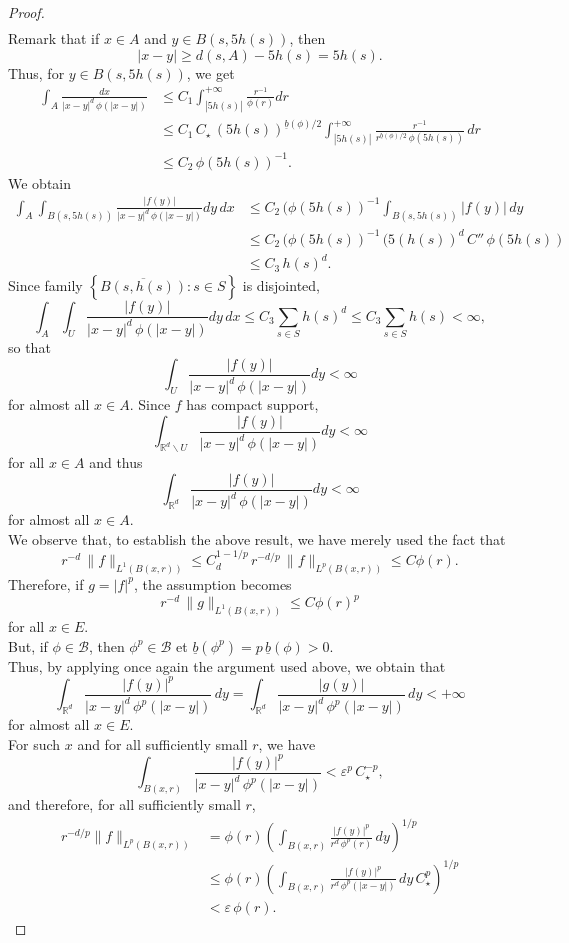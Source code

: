 \documentclass[a4paper,10pt]{article}
\theoremstyle{thmstyleone}%
\theoremstyle{thmstyletwo}%
\theoremstyle{thmstylethree}%
\begin{document}
\begin{proof}
\begin{align*}
\end{align*}
Remark that if $x\in A$ and $y\in B(s,5h(s))$, then
\[|x-y|\geq  d(s,A)-5h(s)=5h(s).\]
Thus, for $y\in B(s,5h(s))$, we get 
\begin{align*}
\int_A \frac{dx}{|x-y|^{d}\,\phi(|x-y|)}
&\leq C_1\int_{|5h(s)|}^{+\infty}\frac{r^{-1}}{\phi(r)}dr\\
&\leq C_1\,C_\star \,(5h(s))^{\underline{b}(\phi)/2}\int_{|5h(s)|}^{+\infty} \frac{r^{-1}}{r^{\underline{b}(\phi)/2}\,\phi(5h(s))}\,dr\\
&\leq C_2\,\phi(5h(s))^{-1}.
\end{align*}
We obtain
\begin{align*}
\int_A \int_{B(s,5h(s))}\frac{|f(y)|}{|x-y|^{d}\,\phi(|x-y|)}dy\,dx &\leq C_2\,(\phi(5h(s))^{-1}\int_{B(s,5h(s))}|f(y)|\,dy\\
&\leq C_2\,(\phi(5h(s))^{-1}\,(5(h(s))^d\,C''\,\phi(5h(s))\\
&\leq C_3\,h(s)^{d}.
\end{align*}
Since family $\left\{\overline{B(s,h(s))}:s\in S\right\}$ is disjointed,
\[\int_A\int_U\frac{|f(y)|}{|x-y|^{d}\,\phi(|x-y|)}dy\,dx\leq C_3\sum_{s\in S}h(s)^{d}\leq C_3\sum_{s\in S}h(s)<\infty,\]
so that
\[\int_U\frac{|f(y)|}{|x-y|^{d}\,\phi(|x-y|)}dy<\infty\]
for almost all $x\in A$. Since $f$ has compact support,
\[\int_{\mathbb{R}^d\backslash U}\frac{|f(y)|}{|x-y|^{d}\,\phi(|x-y|)}dy<\infty\]
for all $x\in A$ and thus
\[\int_{\mathbb{R}^d}\frac{|f(y)|}{|x-y|^{d}\,\phi(|x-y|)}dy<\infty\]
for almost all $x\in A$.
\\We observe that, to establish the above result, we have merely used the fact that
\[r^{-d}\,\|f\|_{L^1(B(x,r))}\leq C_d^{1-1/p}\,r^{-d/p}\,\|f\|_{L^p(B(x,r))}\leq C\phi(r).\]
Therefore, if $g=|f|^p$, the assumption becomes
\[r^{-d}\,\|g\|_{L^1(B(x,r))}\leq C\phi(r)^p\]
for all $x\in E$. 
\\But, if $\phi\in \mathcal{B}$, then $\phi^p\in  \mathcal{B}$ et $\underline{b}(\phi^p)=p\,\underline{b}(\phi)>0$.
\\Thus, by applying once again the argument used above, we obtain that
\[\int_{\mathbb{R}^d}\frac{|f(y)|^p}{|x-y|^{d}\,\phi^p(|x-y|)}\,dy=\int_{\mathbb{R}^d}\frac{|g(y)|}{|x-y|^{d}\,\phi^p(|x-y|)}\,dy<+\infty\]
for almost all $x\in E$.
\\For such $x$ and for all sufficiently small $r$, we have
\[\int_{B(x,r)}\frac{|f(y)|^p}{|x-y|^{d}\,\phi^p(|x-y|)}<\varepsilon^p\,C_\star^{-p},\]
and therefore, for all sufficiently small $r$,
\begin{align*}
r^{-d/p}\|f\|_{L^p(B(x,r))}&=\phi(r)\left(\int_{B(x,r)}\frac{|f(y)|^p}{r^{d}\,\phi^p(r)}\,dy\right)^{1/p}\\
&\leq \phi(r)\left(\int_{B(x,r)}\frac{|f(y)|^p}{r^{d}\,\phi^p(|x-y|)}\,dy\,C_\star^p\right)^{1/p}\\
& < \varepsilon\,\phi(r).
\end{align*}
\end{proof}
\end{document}
